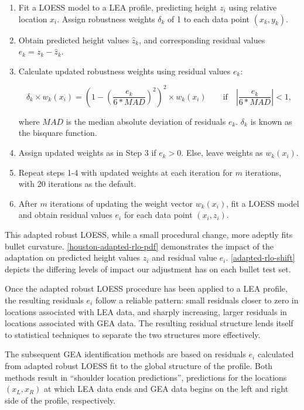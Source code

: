 \documentclass[12pt]{article}
\begin{document}
\begin{enumerate}

\item Fit a LOESS model to a LEA profile, predicting height $z_i$ using relative location $x_i$. Assign robustness weights $\delta_k$ of 1 to each data point $(x_k, y_k)$.  
\item Obtain predicted height values $\widehat{z}_k$, and corresponding residual values $e_k = z_k - \widehat{z}_k$. 
\item Calculate updated robustness weights using residual values $e_k$: 

$$\delta_k \times w_k(x_i) =\left(1 - \left(\frac{e_k}{6*MAD}\right)^2\right)^2 \times w_k(x_i) \quad \quad \mbox{if}\quad \left|\frac{e_k}{6*MAD} \right| < 1,$$

where $MAD$ is the median absolute deviation of residuals $e_k$. $\delta_k$ is known as the bisquare function.  
\item Assign updated weights as in Step 3 if $e_k > 0$. Else, leave weights as $w_k(x_i)$. 
\item Repeat steps 1-4 with updated weights at each iteration for $m$ iterations, with 20 iterations as the default.  
\item After $m$ iterations of updating the weight vector $w_k(x_i)$, fit a LOESS model and obtain residual values $e_i$ for each data point $(x_i, z_i)$.  

\end{enumerate}

This adapted robust LOESS, while a small procedural change, more adeptly
fits bullet curvature. \autoref{houston-adapted-rlo-pdf} demonstrates
the impact of the adaptation on predicted height values \(z_i\) and
residual value \(e_i\). \autoref{adapted-rlo-shift} depicts the
differing levels of impact our adjustment has on each bullet test set.

Once the adapted robust LOESS procedure has been applied to a LEA
profile, the resulting residuals \(e_i\) follow a reliable pattern:
small residuals closer to zero in locations associated with LEA data,
and sharply increasing, larger residuals in locations associated with
GEA data. The resulting residual structure lends itself to statistical
techniques to separate the two structures more effectively.

The subsequent GEA identification methods are based on residuals \(e_i\)
calculated from adapted robust LOESS fit to the global structure of the
profile. Both methods result in ``shoulder location predictions'',
predictions for the locations \((x_L, x_R)\) at which LEA data ends and
GEA data begins on the left and right side of the profile, respectively.
\end{document}
